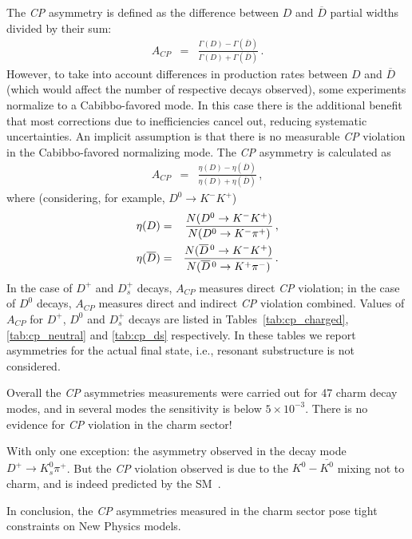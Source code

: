 \vspace{0.8cm}
The \emph{CP} asymmetry is defined as the difference between 
$D$ and $\overline{D}$ partial widths divided by their sum:
\begin{eqnarray}  
A_{CP} & = & \frac{\Gamma(D)-\Gamma(\overline{D})}
{\Gamma(D)+\Gamma(\overline{D})}\,.
\end{eqnarray}
However, to take into account differences in production rates between 
$D$ and $\overline{D}$ (which would affect the number of respective 
decays observed), some experiments normalize to a Cabibbo-favored 
mode. In this case there is the additional benefit that most corrections 
due to inefficiencies cancel out, reducing systematic uncertainties. An 
implicit assumption is that there is no measurable \emph{CP} 
violation in the Cabibbo-favored normalizing mode. 
The \emph{CP} asymmetry is calculated as
\begin{eqnarray}
A_{CP} & = & \frac{\eta(D)-\eta(\overline{D})}{\eta(D)+\eta(\overline{D})}\,,
\end{eqnarray}
where (considering, for example, $D^0 \to K^-K^+$)
\begin{eqnarray}
 \eta(D) & = & \frac{N(D^0 \rightarrow K^-K^+)}{N(D^0 \rightarrow K^-\pi^+)}\,, \\
 \eta(\overline{D}) & = & \frac{N(\overline{D}{}^{\,0}\rightarrow K^-K^+)}
{N(\overline{D}{}^{\,0}\rightarrow K^+\pi^-)}\,.
\end{eqnarray}
In the case of $D^+$ and $D^+_s$ decays, $A^{}_{CP}$ measures 
direct \emph{CP} violation; in the case of $D^0$ decays, $A^{}_{CP}$ 
measures direct and indirect \emph{CP} violation combined.
Values of $A^{}_{CP}$ for $D^+$, $D^0$ and $D_s^+$ decays are listed in
Tables~\ref{tab:cp_charged}, \ref{tab:cp_neutral} and \ref{tab:cp_ds} respectively.
In these tables we report asymmetries for the actual final state, i.e., resonant substructure 
is not considered.

Overall the \emph{CP} asymmetries measurements were carried out for 47 charm decay modes, and in
several modes the sensitivity is below $5 \times 10^{-3}$. There is no evidence for \emph{CP} violation 
in the charm sector!

With only one exception: the asymmetry observed in the decay mode $D^+ \to K^0_s\pi^+$. 
But the \emph{CP} violation observed is due to the $ K^0-\overline{K^0}$ mixing not to charm, and is indeed 
predicted by the SM~\cite{Grossman:2012aa}.

In conclusion, the \emph{CP} asymmetries measured in the charm sector pose tight constraints on New Physics models.

